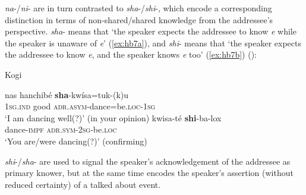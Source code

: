 \documentclass[output=paper]{langsci/langscibook}
\begin{document}
\textit{na}-/\textit{ni}- are in turn contrasted to \textit{sha}-/\textit{shi}-, which encode a corresponding distinction in terms of non-shared/shared knowledge from the addressee’s perspective. \textit{sha}- means that ‘the speaker expects the addressee to know \textit{e} while the speaker is unaware of \textit{e}’ (\ref{ex:hb7a}), and \textit{shi}- means that ‘the speaker expects the addressee to know \textit{e}, and the speaker knows \textit{e} too’ (\ref{ex:hb7b}) (\citealt[3]{Bergqvist2016}):


\begin{exe}
\ex Kogi\label{ex:hb7}
	\begin{xlist}
	\ex \label{ex:hb7a}
	\gll nas	 hanchibé \textbf{sha}-kwísa=tuk-(k)u\\
	1\textsc{sg}.\textsc{ind}	good \textsc{adr}.\textsc{asym}-dance=be.\textsc{loc}-1\textsc{sg}\\
	\trans ‘I am dancing well(?)’ (in your opinion) 
	\ex \label{ex:hb7b}
	\gll kwisa-té	\textbf{shi}-ba-lox\\
	dance-\textsc{impf}	\textsc{adr}.\textsc{sym}-2\textsc{sg}-be.\textsc{loc}\\
	\trans ‘You are/were dancing(?)’ (confirming)  
	\end{xlist}
\end{exe}

\textit{shi}-/\textit{sha}- are used to signal the speaker’s acknowledgement of the addressee as primary knower, but at the same time encodes the speaker’s assertion (without reduced certainty) of a talked about event. 
\end{document}
